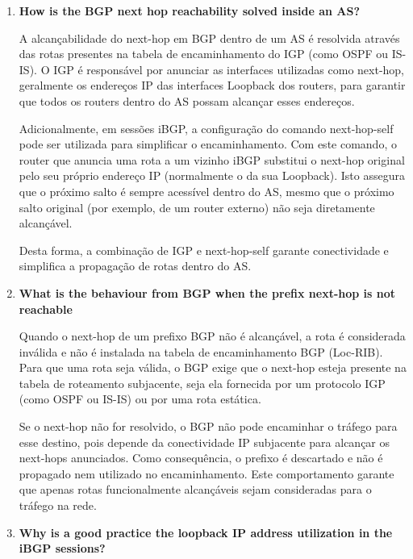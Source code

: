 \documentclass[11pt,english, openright, oneside]{book}
\begin{document}
\begin{enumerate}
  \item \textbf{How is the BGP next hop reachability solved inside an AS?} 
  \vspace{0.2cm}

  A alcançabilidade do next-hop em BGP dentro de um AS é resolvida através das rotas presentes na tabela de encaminhamento do IGP (como OSPF ou IS-IS). O IGP é responsável por anunciar as interfaces utilizadas como next-hop, geralmente os endereços IP das interfaces Loopback dos routers, para garantir que todos os routers dentro do AS possam alcançar esses endereços.

  Adicionalmente, em sessões iBGP, a configuração do comando next-hop-self pode ser utilizada para simplificar o encaminhamento. Com este comando, o router que anuncia uma rota a um vizinho iBGP substitui o next-hop original pelo seu próprio endereço IP (normalmente o da sua Loopback). Isto assegura que o próximo salto é sempre acessível dentro do AS, mesmo que o próximo salto original (por exemplo, de um router externo) não seja diretamente alcançável.

  Desta forma, a combinação de IGP e next-hop-self garante conectividade e simplifica a propagação de rotas dentro do AS.
  \vspace{0.2cm}

  \item \textbf{What is the behaviour from BGP when the prefix next-hop is not reachable} 
  \vspace{0.2cm}

  Quando o next-hop de um prefixo BGP não é alcançável, a rota é considerada inválida e não é instalada na tabela de encaminhamento BGP (Loc-RIB). Para que uma rota seja válida, o BGP exige que o next-hop esteja presente na tabela de roteamento subjacente, seja ela fornecida por um protocolo IGP (como OSPF ou IS-IS) ou por uma rota estática.

  Se o next-hop não for resolvido, o BGP não pode encaminhar o tráfego para esse destino, pois depende da conectividade IP subjacente para alcançar os next-hops anunciados. Como consequência, o prefixo é descartado e não é propagado nem utilizado no encaminhamento. Este comportamento garante que apenas rotas funcionalmente alcançáveis sejam consideradas para o tráfego na rede.

  \vspace{0.2cm}

  \item \textbf{Why is a good practice the loopback IP address utilization in the iBGP sessions?} 
  \vspace{0.2cm}


\end{enumerate}
\end{document}

